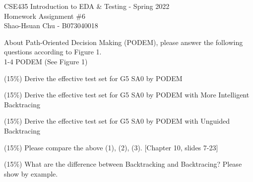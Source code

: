\documentclass[12pt,answers]{exam}
\begin{document}
\begin{center}
\LARGE CSE435 Introduction to EDA \& Testing - Spring 2022 \\
\Large Homework Assignment \#6 \\
\Large Shao-Hsuan Chu - B073040018 \\
\end{center}
\bigskip

About Path-Oriented Decision Making (PODEM), please answer the following questions according to Figure 1. \\
1-4 PODEM (See Figure 1)
\begin{questions}
  \question (15\%) Derive the effective test set for G5 SA0 by PODEM
  
  \begin{solution}
    
  \end{solution}

  \question (15\%) Derive the effective test set for G5 SA0 by PODEM with More Intelligent Backtracing
  \begin{solution}
    
  \end{solution}

  \question (15\%) Derive the effective test set for G5 SA0 by PODEM with Unguided Backtracing
  \begin{solution}
    
  \end{solution}

  \question (15\%) Please compare the above (1), (2), (3). [Chapter 10, slides 7-23]

  \question (15\%) What are the difference between Backtracking and Backtracing? Please show by example.
  \begin{solution}
    
  \end{solution}


\end{questions}
\end{document}
